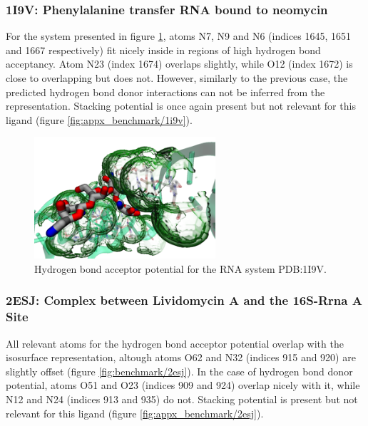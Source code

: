     \subsubsection{1I9V: Phenylalanine transfer RNA bound to neomycin}
      For the system presented in figure \ref{fig:benchmark/1i9v}, atoms N7, N9 and N6 (indices 1645, 1651 and 1667 respectively) fit nicely inside in regions of high hydrogen bond acceptancy. Atom N23 (index 1674) overlaps slightly, while O12 (index 1672) is close to overlapping but does not. However, similarly to the previous case, the predicted hydrogen bond donor interactions can not be inferred from the representation. Stacking potential is once again present but not relevant for this ligand (figure \ref{fig:appx_benchmark/1i9v}).

      \begin{figure}[H]
        \centering
        \includegraphics[width=0.6\textwidth]{figures/results/benchmark_rna/1i9v.png}
        \caption{\label{fig:benchmark/1i9v} Hydrogen bond acceptor potential for the RNA system PDB:1I9V.}
      \end{figure}

    \subsubsection{2ESJ: Complex between Lividomycin A and the 16S-Rrna A Site}
      All relevant atoms for the hydrogen bond acceptor potential overlap with the isosurface representation, altough atoms O62 and N32 (indices 915 and 920) are slightly offset (figure \ref{fig:benchmark/2esj}). In the case of hydrogen bond donor potential, atoms O51 and O23 (indices 909 and 924) overlap nicely with it, while N12 and N24 (indices 913 and 935) do not. Stacking potential is present but not relevant for this ligand (figure \ref{fig:appx_benchmark/2esj}).


